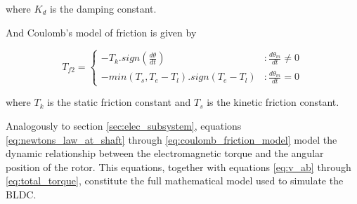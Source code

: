 \documentclass{article}
\begin{document}
    where $K_d$ is the damping constant.

    And Coulomb's model of friction \cite[p.171]{ref:coulomb_friction} is given by

    \begin{equation}
       T_{f2} = \left\{
         \begin{array}{lr}
           -T_k.sign(\frac{d\theta}{dt}) & : \frac{d\theta_m}{dt} \neq 0\\
           -min(T_s,T_e-T_l).sign(T_e-T_l) & : \frac{d\theta_m}{dt} = 0
         \end{array}
       \right.
       \label{eq:coulomb_friction_model}
    \end{equation}

    where $T_k$ is the static friction constant and $T_s$ is the kinetic friction constant.

    Analogously to section \ref{sec:elec_subsystem}, equations \ref{eq:newtons_law_at_shaft} through \ref{eq:coulomb_friction_model} model the dynamic relationship between the electromagnetic torque and the angular position of the rotor. This equations, together with equations \ref{eq:v_ab} through \ref{eq:total_torque}, constitute the full mathematical model used to simulate the BLDC.


    
    
\end{document}
